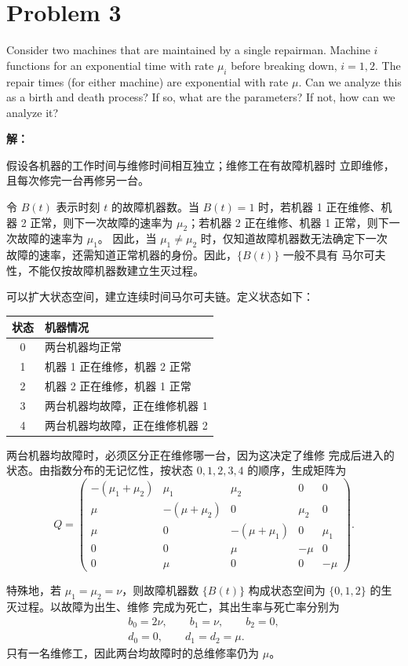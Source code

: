 \documentclass[12pt,a4paper]{article}
\begin{document}
\clearpage
\section{Problem 3}

Consider two machines that are maintained by a single repairman. Machine $i$
functions for an exponential time with rate $\mu_i$ before breaking down,
$i = 1, 2$. The repair times (for either machine) are exponential with rate
$\mu$. Can we analyze this as a birth and death process? If so, what are the
parameters? If not, how can we analyze it?

\begin{answerbox}
\textbf{解：}

假设各机器的工作时间与维修时间相互独立；维修工在有故障机器时
立即维修，且每次修完一台再修另一台。

令 $B(t)$ 表示时刻 $t$ 的故障机器数。当 $B(t)=1$ 时，若机器 1
正在维修、机器 2 正常，则下一次故障的速率为 $\mu_2$；若机器 2
正在维修、机器 1 正常，则下一次故障的速率为 $\mu_1$。
因此，当 $\mu_1\ne\mu_2$ 时，仅知道故障机器数无法确定下一次
故障的速率，还需知道正常机器的身份。因此，$\{B(t)\}$ 一般不具有
马尔可夫性，不能仅按故障机器数建立生灭过程。

可以扩大状态空间，建立连续时间马尔可夫链。定义状态如下：
\begin{center}
\begin{tabular}{cl}
\toprule
状态 & 机器情况 \\
\midrule
0 & 两台机器均正常 \\
1 & 机器 1 正在维修，机器 2 正常 \\
2 & 机器 2 正在维修，机器 1 正常 \\
3 & 两台机器均故障，正在维修机器 1 \\
4 & 两台机器均故障，正在维修机器 2 \\
\bottomrule
\end{tabular}
\end{center}
两台机器均故障时，必须区分正在维修哪一台，因为这决定了维修
完成后进入的状态。由指数分布的无记忆性，按状态 $0,1,2,3,4$
的顺序，生成矩阵为
$$
Q=
\begin{pmatrix}
-(\mu_1+\mu_2)&\mu_1&\mu_2&0&0\\
\mu&-(\mu+\mu_2)&0&\mu_2&0\\
\mu&0&-(\mu+\mu_1)&0&\mu_1\\
0&0&\mu&-\mu&0\\
0&\mu&0&0&-\mu
\end{pmatrix}.
$$

特殊地，若 $\mu_1=\mu_2=\nu$，则故障机器数 $\{B(t)\}$
构成状态空间为 $\{0,1,2\}$ 的生灭过程。以故障为出生、维修
完成为死亡，其出生率与死亡率分别为
$$
\begin{gathered}
b_0=2\nu,\qquad b_1=\nu,\qquad b_2=0,\\
d_0=0,\qquad d_1=d_2=\mu.
\end{gathered}
$$
只有一名维修工，因此两台均故障时的总维修率仍为 $\mu$。

\end{answerbox}
\end{document}
